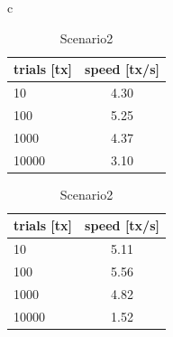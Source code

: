 \documentclass[a4paper, oneside]{discothesis}
\begin{document}
\begin{table}[htb]
    \begin{center}
        \begin{tabular}{c}

            \begin{minipage}{0.5\hsize}
                \begin{center}
                    \caption{Scenario1}
                    \begin{tabular}{|l|c|} \hline
                        trials [tx] & speed [tx/s]\\ \hline \hline
                        10 & 4.30 \\
                        100 & 5.25 \\
                        1000 & 4.37 \\ 
                        10000 & 3.10 \\ \hline
                    \end{tabular}
                \end{center}
            \end{minipage}

            \begin{minipage}{0.5\hsize}
                \begin{center}
                    \caption{Scenario2}
                    \begin{tabular}{|l|c|} \hline
                        trials [tx] & speed [tx/s]\\ \hline \hline
                        10 & 5.11 \\
                        100 & 5.56 \\
                        1000 & 4.82 \\
                        10000 & 1.52 \\ \hline
                    \end{tabular}
                \end{center}
            \end{minipage}

        \end{tabular}
    \end{center}
\end{table}
\end{document}
